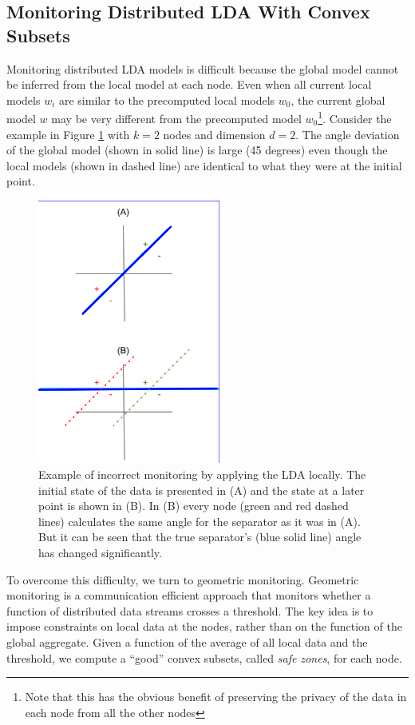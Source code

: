 \documentclass{sig-alternate-05-2015}
\begin{document}
\subsection{Monitoring Distributed LDA With Convex Subsets}
Monitoring distributed LDA models is difficult because the
global model cannot be inferred from the local model at each
node. Even when all current local models $w_i$ are similar to the precomputed
local models $w_0$, the current global model $w$ may
be very different from the precomputed model $w_0$\footnote{Note that this has the obvious benefit of preserving the privacy of the data in each node from all the other nodes}. Consider
the example in Figure \ref{NegativeExample} with $k = 2$ nodes and dimension $d =
2$. The angle deviation of the global model (shown in solid line) is large (45 degrees) even
though the local models (shown in dashed line) are identical to what they were at the initial
point.

\begin{figure}[h]
\centering
\includegraphics[width=60mm]{NegativeExample.png}
\caption{Example of incorrect monitoring by applying the LDA locally. The
initial state of the data is presented in (A) and the state at a later point
is shown in (B). In (B) every node (green and red dashed lines) calculates the same angle
for the separator as it was in (A). But it can be
seen that the true separator's (blue solid line) angle has changed
significantly.}
\label{NegativeExample}
\end{figure}


\par To overcome this difficulty, we turn to geometric monitoring. Geometric
monitoring \cite{keren2014geometric, keren2012shape} is a communication
efficient approach that monitors whether a function of distributed
data streams crosses a threshold. The key idea is to
impose constraints on local data at the nodes, rather than
on the function of the global aggregate. Given a function of
the average of all local data and the threshold, we compute a
``good'' convex subsets, called \textit{safe zones}, for each
node.
\end{document}
